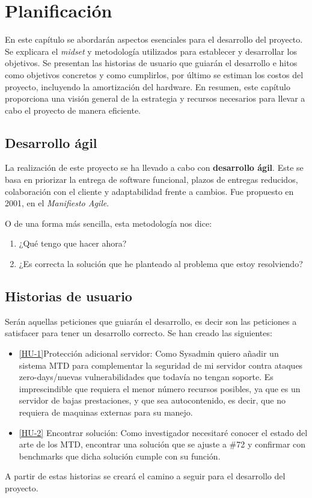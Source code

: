 \chapter{Planificación}
En este capítulo se abordarán aspectos esenciales para el desarrollo del proyecto. Se explicara el \textit{midset} y metodología utilizados para establecer y desarrollar los objetivos. Se presentan las historias de usuario que guiarán el desarrollo e hitos como objetivos concretos y como cumplirlos, por último se estiman los costos del proyecto, incluyendo la amortización del hardware. En resumen, este capítulo proporciona una visión general de la estrategia y recursos necesarios para llevar a cabo el proyecto de manera eficiente.

\section{Desarrollo ágil}
La realización de este proyecto se ha llevado a cabo con \textbf{desarrollo ágil}. Este se basa en priorizar la entrega de software funcional, plazos de entregas reducidos, colaboración con el cliente y adaptabilidad frente a cambios. Fue propuesto en 2001, en el \textit{Manifiesto Agile}.\cite{agile}

O de una forma más sencilla, esta metodología nos dice:
\begin{enumerate}
    \item ¿Qué tengo que hacer ahora?
    \item ¿Es correcta la solución que he planteado al problema que estoy resolviendo?
\end{enumerate}

\section{Historias de usuario}
Serán aquellas peticiones que guiarán el desarrollo, es decir son las peticiones a satisfacer para tener un desarrollo correcto. Se han creado las siguientes:
\begin{itemize}
    \item \href{https://github.com/marcosrmartin/MTD_Server/issues/72}{[HU-1]}Protección adicional servidor: Como Sysadmin quiero añadir un sistema MTD para complementar la seguridad de mi servidor contra ataques zero-days/nuevas vulnerabilidades que todavía no tengan soporte. Es imprescindible que requiera el menor número recursos posibles, ya que es un servidor de bajas prestaciones, y que sea autocontenido, es decir, que no requiera de maquinas externas para su manejo.    
    \item \href{https://github.com/marcosrmartin/MTD_Server/issues/73}{[HU-2]} Encontrar solución: Como investigador necesitaré conocer el estado del arte de los MTD, encontrar una solución que se ajuste a \#72 y confirmar con benchmarks que dicha solución cumple con su función.
\end{itemize}
A partir de estas historias se creará el camino a seguir para el desarrollo del proyecto.

